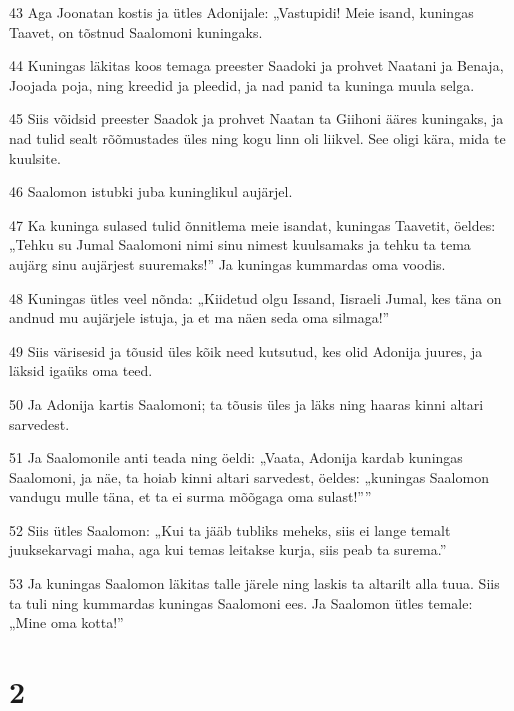 \par 43 Aga Joonatan kostis ja ütles Adonijale: „Vastupidi! Meie isand, kuningas Taavet, on tõstnud Saalomoni kuningaks.
\par 44 Kuningas läkitas koos temaga preester Saadoki ja prohvet Naatani ja Benaja, Joojada poja, ning kreedid ja pleedid, ja nad panid ta kuninga muula selga.
\par 45 Siis võidsid preester Saadok ja prohvet Naatan ta Giihoni ääres kuningaks, ja nad tulid sealt rõõmustades üles ning kogu linn oli liikvel. See oligi kära, mida te kuulsite.
\par 46 Saalomon istubki juba kuninglikul aujärjel.
\par 47 Ka kuninga sulased tulid õnnitlema meie isandat, kuningas Taavetit, öeldes: „Tehku su Jumal Saalomoni nimi sinu nimest kuulsamaks ja tehku ta tema aujärg sinu aujärjest suuremaks!” Ja kuningas kummardas oma voodis.
\par 48 Kuningas ütles veel nõnda: „Kiidetud olgu Issand, Iisraeli Jumal, kes täna on andnud mu aujärjele istuja, ja et ma näen seda oma silmaga!”
\par 49 Siis värisesid ja tõusid üles kõik need kutsutud, kes olid Adonija juures, ja läksid igaüks oma teed.
\par 50 Ja Adonija kartis Saalomoni; ta tõusis üles ja läks ning haaras kinni altari sarvedest.
\par 51 Ja Saalomonile anti teada ning öeldi: „Vaata, Adonija kardab kuningas Saalomoni, ja näe, ta hoiab kinni altari sarvedest, öeldes: „kuningas Saalomon vandugu mulle täna, et ta ei surma mõõgaga oma sulast!””
\par 52 Siis ütles Saalomon: „Kui ta jääb tubliks meheks, siis ei lange temalt juuksekarvagi maha, aga kui temas leitakse kurja, siis peab ta surema.”
\par 53 Ja kuningas Saalomon läkitas talle järele ning laskis ta altarilt alla tuua. Siis ta tuli ning kummardas kuningas Saalomoni ees. Ja Saalomon ütles temale: „Mine oma kotta!”

\chapter{2}


